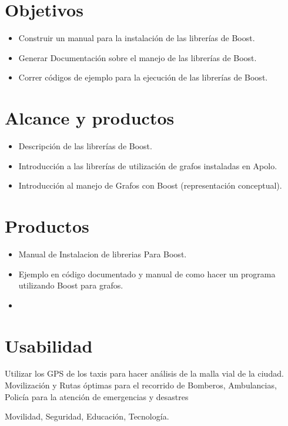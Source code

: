 \section{Objetivos}

	\begin{itemize}
		\item Construir un manual para la instalación de las librerías de Boost.
		\item Generar Documentación sobre el manejo de las librerías de Boost.
		\item Correr códigos de ejemplo para la ejecución de las librerías de Boost.
	\end{itemize}

\section{Alcance y productos}
	\begin{itemize}
		\item Descripción de las librerías de Boost.
		\item Introducción a las librerías de utilización de grafos instaladas en Apolo.
		\item Introducción al manejo de Grafos con Boost (representación conceptual).
	\end{itemize}

\section{Productos}
	\begin{itemize}
		\item Manual de Instalacion de librerias Para Boost.
		\item Ejemplo en código documentado y manual de como hacer un programa utilizando Boost para grafos.	
		\item 
	\end{itemize}

\section{Usabilidad}

	Utilizar los GPS de los taxis para hacer análisis de la malla vial de la ciudad. 
	Movilización y Rutas óptimas para el recorrido de Bomberos, Ambulancias, Policía para la atención de emergencias y desastres

	Movilidad, Seguridad, Educación, Tecnología.

